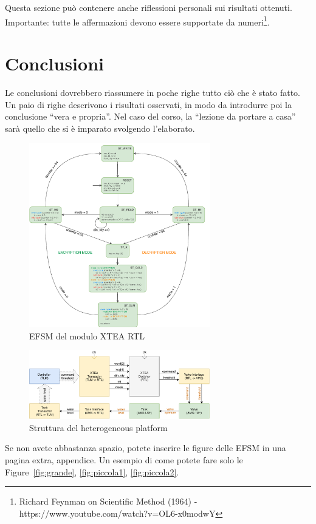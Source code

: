 \documentclass[]{IEEEtran}
\begin{document}
Questa sezione pu\`o contenere anche riflessioni personali sui risultati ottenuti. Importante: tutte le affermazioni 
devono essere supportate da numeri\footnote{Richard Feynman on Scientific Method (1964) -\\ 
https://www.youtube.com/watch?v=OL6-x0modwY}.

\section{Conclusioni}
Le conclusioni dovrebbero riassumere in poche righe  tutto ci\`o che \`e stato fatto. Un paio di righe descrivono i 
risultati osservati, in modo da introdurre poi la conclusione ``vera e propria''. Nel caso del corso, la ``lezione da 
portare a casa'' sar\`a quello che si \`e imparato svolgendo l'elaborato.





\appendix
\begin{figure}[bt]
	\centering
	\includegraphics[width=0.7\textwidth]{figures/efsm.pdf}
	\caption{EFSM del modulo XTEA RTL}
	\label{fig:efsm}
\end{figure}
\begin{figure}[bt]
	\centering
	\includegraphics[width=0.7\textwidth]{figures/heterogeneous.pdf}
	\caption{Struttura del heterogeneous platform}
	\label{fig:heterogeneous}
\end{figure}

Se non avete abbastanza spazio, potete inserire le figure delle EFSM in una  pagina extra, appendice. Un esempio di come 
potete fare solo le Figure~\ref{fig:grande}, \ref{fig:piccola1}, \ref{fig:piccola2}.
\end{document}
